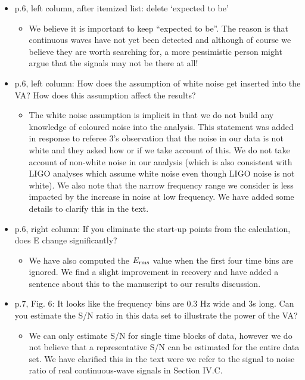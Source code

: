 \documentclass[a4paper, 10pt]{letter}
\begin{document}
\begin{itemize}
\item p.6, left column, after itemized list: delete `expected to be' 
\begin{itemize}
\item We believe it is important to keep ``expected to be''. The reason is that continuous waves have not yet been detected and although of course we believe they are worth searching for, a more pessimistic person might argue that the signals may not be there at all! 
\end{itemize}

\item p.6, left column: How does the assumption of white noise get inserted into the VA? How does this assumption affect the results?
\begin{itemize}
\item The white noise assumption is implicit in that we do not build any knowledge of coloured noise into the analysis. This statement was added in response to referee 3's observation that the noise in our data is not white and they asked how or if we take account of this. We do not take account of non-white noise in our analysis (which is also consistent with LIGO analyses which assume white noise even though LIGO noise is not white). We also note that the narrow frequency range we consider is less impacted by the increase in noise at low frequency. We have added some details to clarify this in the text. 
\end{itemize}

\item p.6, right column: If you eliminate the start-up points from the calculation, does E change significantly?
\begin{itemize}
\item We have also computed the $E_{\rm rms}$ value when the first four time bins are ignored. We find a slight improvement in recovery and have added a sentence about this to the manuscript to our results discussion. 
\end{itemize}

\item p.7, Fig. 6: It looks like the frequency bins are 0.3 Hz wide and 3s long. Can you estimate the S/N ratio in this data set to illustrate the power of the VA?
\begin{itemize}
\item We can only estimate S/N for single time blocks of data, however we do not believe that a representative S/N can be estimated for the entire data set. We have clarified this in the text were we refer to the signal to noise ratio of real continuous-wave signals in Section IV.C.
\end{itemize}


\end{itemize}
\end{document}
